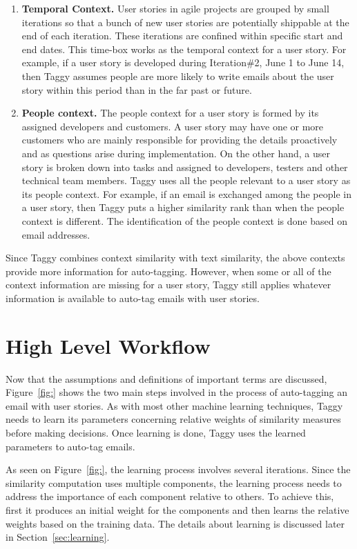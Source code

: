 \begin{enumerate}
	\item \textbf{Temporal Context.} User stories in agile projects are grouped by small iterations so that a bunch of new user stories are potentially shippable at the end of each iteration. These iterations are confined within specific start and end dates. This time-box works as the temporal context for a user story. For example, if a user story is developed during Iteration\#2, June 1 to June 14, then Taggy assumes people are more likely to write emails about the user story within this period than in the far past or future.
	
	\item \textbf{People context.} The people context for a user story is formed by its assigned developers and customers. A user story may have one or more customers who are mainly responsible for providing the details proactively and as questions arise during implementation. On the other hand, a user story is broken down into tasks and assigned to developers, testers and other technical team members. Taggy uses all the people relevant to a user story as its people context. For example, if an email is exchanged among the people in a user story, then Taggy puts a higher similarity rank than when the people context is different. The identification of the people context is done based on email addresses.
\end{enumerate}

Since Taggy combines context similarity with text similarity, the above contexts provide more information for auto-tagging. However, when some or all of the context information are missing for a user story, Taggy still applies whatever information is available to auto-tag emails with user stories.

\section{High Level Workflow}
Now that the assumptions and definitions of important terms are discussed, Figure~\ref{fig:} shows the two main steps involved in the process of auto-tagging an email with user stories. As with most other machine learning techniques, Taggy needs to learn its parameters concerning relative weights of similarity measures before making decisions. Once learning is done, Taggy uses the learned parameters to auto-tag emails.

As seen on Figure~\ref{fig:}, the learning process involves several iterations. Since the similarity computation uses multiple components, the learning process needs to address the importance of each component relative to others. To achieve this, first it produces an initial weight for the components and then learns the relative weights based on the training data. The details about learning is discussed later in Section~\ref{sec:learning}.

